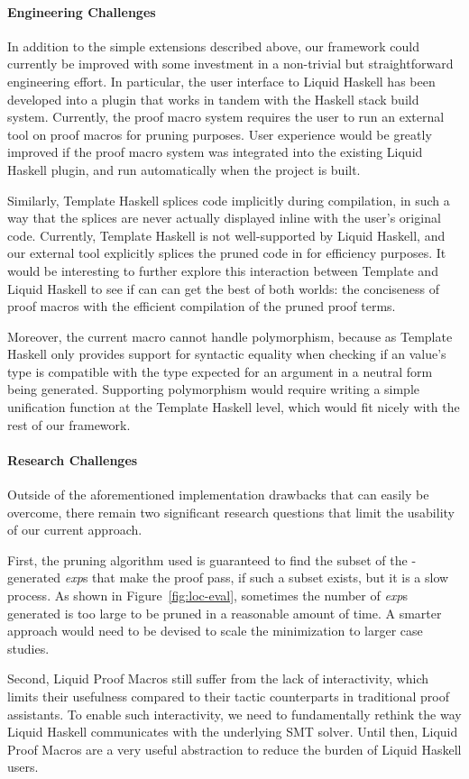 \paragraph{Engineering Challenges}

In addition to the simple extensions described above, our framework
could currently be improved with some investment in a non-trivial but
straightforward engineering effort. In particular, the user interface
to Liquid Haskell has been developed into a plugin that works in
tandem with the Haskell stack build system. Currently, the proof macro
system requires the user to run an external tool on proof macros for
pruning purposes. User experience would be greatly improved if
the proof macro system was integrated into the existing Liquid Haskell
plugin, and run automatically when the project is built.

Similarly, Template Haskell splices code implicitly during
compilation, in such a way that the splices are never actually
displayed inline with the user's original code.  Currently, Template
Haskell is not well-supported by Liquid Haskell, and our external tool
explicitly splices the pruned code in for efficiency purposes.  It
would be interesting to further explore this interaction between
Template and Liquid Haskell to see if can can get the best of both
worlds: the conciseness of proof macros with the efficient
compilation of the pruned proof terms.

Moreover, the current  macro cannot handle polymorphism,
because as Template Haskell only provides support for syntactic
equality when checking if an value's type is compatible with the type
expected for an argument in a neutral form being generated. Supporting
polymorphism would require writing a simple unification function at
the Template Haskell level, which would fit nicely with the rest of
our framework.

\paragraph{Research Challenges}

Outside of the aforementioned implementation drawbacks that can easily
be overcome, there remain two significant research questions that
limit the usability of our current approach. 

First, the pruning algorithm used is guaranteed to find the subset of
the -generated \textit{exp}s that make the proof pass, if
such a subset exists, but it is a slow process. As shown in
Figure~\ref{fig:loc-eval}, sometimes the number of \textit{exp}s
generated is too large to be pruned in a reasonable amount of time. A
smarter approach would need to be devised to scale the minimization to
larger case studies.

Second, Liquid Proof Macros still suffer from the lack of
interactivity, which limits their usefulness compared to their tactic
counterparts in traditional proof assistants. To enable such
interactivity, we need to fundamentally rethink the way Liquid Haskell
communicates with the underlying SMT solver. Until then, Liquid Proof
Macros are a very useful abstraction to reduce the burden of Liquid
Haskell users.

